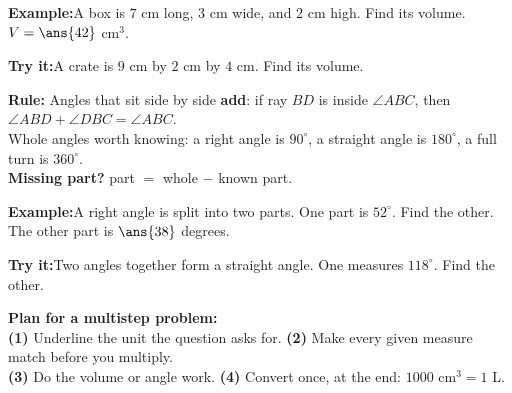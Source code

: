 \documentclass[12pt]{article}
\begin{document}
\begin{examplebox}
\textbf{Example:}\quad A box is $7$ cm long, $3$ cm wide, and $2$ cm high. Find its volume.
$V = \ans{42}$ cm$^3$.
\end{examplebox}

\begin{tryitbox}
\textbf{Try it:}\quad A crate is $9$ cm by $2$ cm by $4$ cm. Find its
volume.\\[2pt]
\end{tryitbox}


\begin{formulabox}
\textbf{Rule:} Angles that sit side by side \textbf{add}: if ray $BD$ is inside
$\angle ABC$, then $\angle ABD + \angle DBC = \angle ABC$.\\[3pt]
Whole angles worth knowing: a right angle is $90^\circ$, a straight angle is
$180^\circ$, a full turn is $360^\circ$.\\[3pt]
\textbf{Missing part?} part $=$ whole $-$ known part.
\end{formulabox}

\begin{examplebox}
\textbf{Example:}\quad A right angle is split into two parts. One part is $52^\circ$. Find the other.
The other part is $\ans{38}$ degrees.
\end{examplebox}

\begin{tryitbox}
\textbf{Try it:}\quad Two angles together form a straight angle. One measures
$118^\circ$. Find the other.\\[2pt]
\end{tryitbox}


\begin{formulabox}
\textbf{Plan for a multistep problem:}\\[3pt]
\textbf{(1)} Underline the unit the question asks for. \quad
\textbf{(2)} Make every given measure match before you multiply.\\
\textbf{(3)} Do the volume or angle work. \quad
\textbf{(4)} Convert once, at the end: $1000$ cm$^3 = 1$ L.
\end{formulabox}
\end{document}

